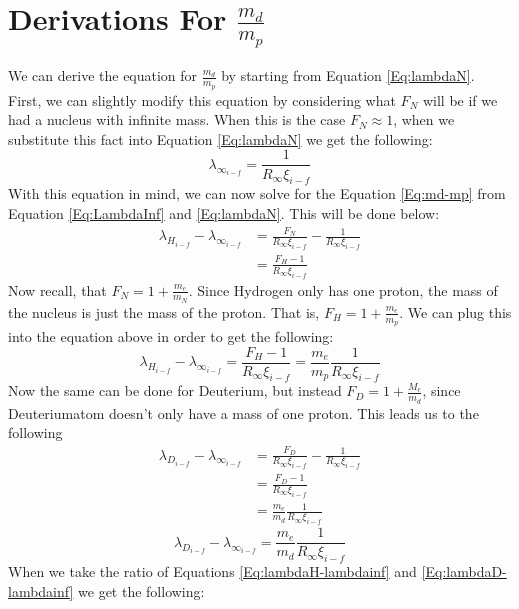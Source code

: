 \documentclass[%
 aps,%
 pra,%
 preprint, %
 amsmath, %
 amsfonts, %
 amssymb, %
]{revtex4-2}
\newcommand{\D}{Deuterium}
\begin{document}
\section{\label{app:DerivationsII} Derivations For $\frac{m_d}{m_p}$}
We can derive the equation for $\frac{m_d}{m_p}$ by starting from Equation \ref{Eq:lambdaN}. First, we can slightly modify this equation by considering what $F_N$ will be if we had a nucleus with infinite mass. When this is the case $F_N \approx 1$, when we substitute this fact into Equation \ref{Eq:lambdaN} we get the following:
\begin{equation}
\label{Eq:LambdaInf}
    \lambda_{\infty_{i-f}}=\frac{1}{R_\infty\xi_{i-f}}
\end{equation}{}
With this equation in mind, we can now solve for the Equation \ref{Eq:md-mp} from Equation \ref{Eq:LambdaInf} and \ref{Eq:lambdaN}. This will be done below:
\begin{align*}
    \lambda_{H_{i-f}}-\lambda_{\infty_{i-f}}&=\frac{F_N}{R_\infty\xi_{i-f}}-\frac{1}{R_\infty\xi_{i-f}}\\
    &=\frac{F_H-1}{R_\infty\xi_{i-f}}
\end{align*}{}
Now recall, that $F_N=1+\frac{m_e}{m_N}$. Since Hydrogen only has one proton, the mass of the nucleus is just the mass of the proton. That is, $F_H=1+\frac{m_e}{m_p}$. We can plug this into the equation above in order to get the following:
\begin{equation}
    \label{Eq:lambdaH-lambdainf}
    \lambda_{H_{i-f}}-\lambda_{\infty_{i-f}}=\frac{F_H-1}{R_\infty\xi_{i-f}}=\frac{m_e}{m_p}\frac{1}{R_\infty\xi_{i-f}}
\end{equation}{}
Now the same can be done for \D, but instead $F_D=1+\frac{M_e}{m_d}$, since \D atom doesn't only have a mass of one proton. This leads us to the following
\begin{align*}
    \lambda_{D_{i-f}}-\lambda_{\infty_{i-f}}&=\frac{F_D}{R_\infty\xi_{i-f}}-\frac{1}{R_\infty\xi_{i-f}}\\
    &=\frac{F_D-1}{R_\infty\xi_{i-f}}\\
    &=\frac{m_e}{m_d}\frac{1}{R_\infty\xi_{i-f}}
\end{align*}{}
\begin{equation}
    \label{Eq:lambdaD-lambdainf}
    \lambda_{D_{i-f}}-\lambda_{\infty_{i-f}}=\frac{m_e}{m_d}\frac{1}{R_\infty\xi_{i-f}}
\end{equation}{}
When we take the ratio of Equations \ref{Eq:lambdaH-lambdainf} and \ref{Eq:lambdaD-lambdainf} we get the following:
\end{document}
